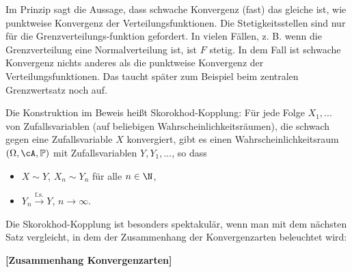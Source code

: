 Im Prinzip sagt die Aussage, dass schwache Konvergenz (fast) das gleiche ist, wie punktweise Konvergenz der Verteilungsfunktionen. Die Stetigkeitsstellen sind nur f\"ur die Grenzverteilungs-funktion gefordert. In vielen F\"allen, z. B. wenn die Grenzverteilung eine Normalverteilung ist, ist $F$ stetig. In dem Fall ist schwache Konvergenz nichts anderes als die punktweise Konvergenz der Verteilungsfunktionen. Das taucht sp\"ater zum Beispiel beim zentralen Grenzwertsatz noch auf.
\begin{bem}
	Die Konstruktion im Beweis heißt Skorokhod-Kopplung: Für jede Folge $X_1, ...$ von Zufallsvariablen (auf beliebigen Wahrscheinlichkeitsr\"aumen), die schwach gegen eine Zufallsvariable $X$ konvergiert, gibt es einen Wahrscheinlichkeitsraum $(\Omega, \cA, \mathbb{P})$ mit Zufallsvariablen $Y, Y_1,...$, so dass
	\begin{itemize}
		\item $X \sim Y$, $X_n \sim Y_n$ f\"ur alle $n\in\N$,
		\item $Y_n \overset{\text{f.s.}}{\longrightarrow} Y$, $n \to \infty$.
	\end{itemize}
\end{bem}
Die Skorokhod-Kopplung ist besonders spektakul\"ar, wenn man mit dem n\"achsten Satz vergleicht, 
in dem der Zusammenhang der Konvergenzarten beleuchtet wird:
\begin{satz}\label{konvergenzsatz}
 \textbf{[Zusammenhang Konvergenzarten]}
\end{satz}


